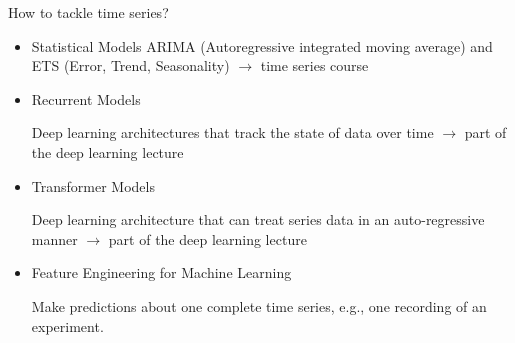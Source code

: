 \documentclass[11pt,compress,t,notes=noshow, xcolor=table]{beamer}
\begin{document}
\begin{vbframe}{How to tackle time series?}
\vfill
    \begin{itemize}
        \item Statistical Models
        ARIMA (Autoregressive integrated moving average) and ETS (Error, Trend, Seasonality) $\rightarrow$ time series course
        
        \item Recurrent Models

        Deep learning architectures that track the state of data over time $\rightarrow$ part of the deep learning lecture

        \item Transformer Models

        Deep learning architecture that can treat series data in an auto-regressive manner $\rightarrow$ part of the deep learning lecture
        
        \item Feature Engineering for Machine Learning

        Make predictions about one complete time series, e.g., one recording of an experiment.
    \end{itemize}
\vfill
\end{vbframe}

\end{document}
